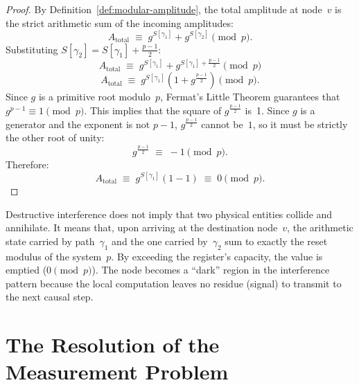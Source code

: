 \begin{proof}
By Definition~\ref{def:modular-amplitude}, the total amplitude at
node~$v$ is the strict arithmetic sum of the incoming amplitudes:
\[
  A_{\text{total}} \;\equiv\; g^{S[\gamma_1]} + g^{S[\gamma_2]} \pmod p.
\]
Substituting $S[\gamma_2] = S[\gamma_1] + \frac{p-1}{2}$:
\[
  A_{\text{total}} \;\equiv\; g^{S[\gamma_1]} + g^{S[\gamma_1] + \frac{p-1}{2}} \pmod p
\]
\[
  A_{\text{total}} \;\equiv\; g^{S[\gamma_1]} \left( 1 + g^{\frac{p-1}{2}} \right) \pmod p.
\]
Since $g$ is a primitive root modulo~$p$, Fermat's Little Theorem
guarantees that $g^{p-1} \equiv 1 \pmod p$. This implies that the square
of $g^{\frac{p-1}{2}}$ is~1. Since $g$ is a generator and the exponent
is not $p-1$, $g^{\frac{p-1}{2}}$ cannot be~$1$, so it must be strictly
the other root of unity:
\[
  g^{\frac{p-1}{2}} \;\equiv\; -1 \pmod p.
\]
Therefore:
\[
  A_{\text{total}} \;\equiv\; g^{S[\gamma_1]} ( 1 - 1 ) \;\equiv\; 0 \pmod p.
\]
\end{proof}

\begin{result}[title={The Computational Nature of the Wave}]
Destructive interference does not imply that two physical entities
collide and annihilate. It means that, upon arriving at the destination
node~$v$, the arithmetic state carried by path~$\gamma_1$ and the one
carried by~$\gamma_2$ sum to exactly the reset modulus of the
system~$p$. By exceeding the register's capacity, the value is
emptied ($0 \pmod p$). The node becomes a ``dark'' region in the
interference pattern because the local computation leaves no residue
(signal) to transmit to the next causal step.
\end{result}


\section{The Resolution of the Measurement Problem}
\label{sec:measurement-problem}

